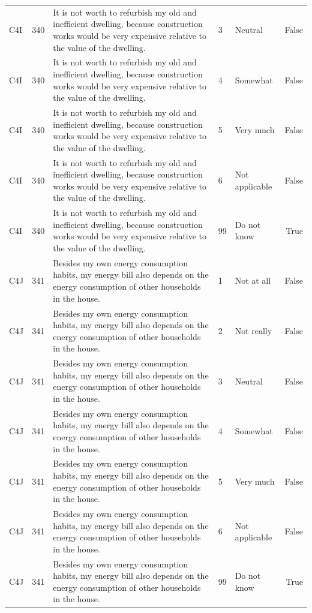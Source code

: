 \begin{tabular}{lrlllr}
C4I & 340 & It is not worth to refurbish my old and inefficient dwelling, because construction works would be very expensive relative to the value of the dwelling. & 3 & Neutral & False \\
C4I & 340 & It is not worth to refurbish my old and inefficient dwelling, because construction works would be very expensive relative to the value of the dwelling. & 4 & Somewhat & False \\
C4I & 340 & It is not worth to refurbish my old and inefficient dwelling, because construction works would be very expensive relative to the value of the dwelling. & 5 & Very much & False \\
C4I & 340 & It is not worth to refurbish my old and inefficient dwelling, because construction works would be very expensive relative to the value of the dwelling. & 6 & Not applicable & False \\
C4I & 340 & It is not worth to refurbish my old and inefficient dwelling, because construction works would be very expensive relative to the value of the dwelling. & 99 & Do not know & True \\
C4J & 341 & Besides my own energy consumption habits, my energy bill also depends on the energy consumption of other households in the house. & 1 & Not at all & False \\
C4J & 341 & Besides my own energy consumption habits, my energy bill also depends on the energy consumption of other households in the house. & 2 & Not really & False \\
C4J & 341 & Besides my own energy consumption habits, my energy bill also depends on the energy consumption of other households in the house. & 3 & Neutral & False \\
C4J & 341 & Besides my own energy consumption habits, my energy bill also depends on the energy consumption of other households in the house. & 4 & Somewhat & False \\
C4J & 341 & Besides my own energy consumption habits, my energy bill also depends on the energy consumption of other households in the house. & 5 & Very much & False \\
C4J & 341 & Besides my own energy consumption habits, my energy bill also depends on the energy consumption of other households in the house. & 6 & Not applicable & False \\
C4J & 341 & Besides my own energy consumption habits, my energy bill also depends on the energy consumption of other households in the house. & 99 & Do not know & True \\

\end{tabular}
